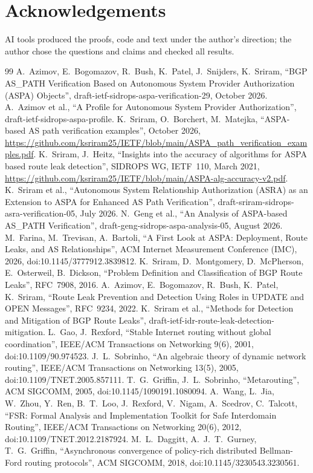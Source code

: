\documentclass[11pt,a4paper]{article}
\theoremstyle{definition}
\theoremstyle{remark}
\begin{document}
\section*{Acknowledgements}
AI tools produced the proofs, code and text under the author's direction; the author chose the questions
and claims and checked all results.

\begin{thebibliography}{99}\small
{} A.~Azimov, E.~Bogomazov, R.~Bush, K.~Patel, J.~Snijders, K.~Sriram,
  ``BGP AS\_PATH Verification Based on Autonomous System Provider Authorization (ASPA) Objects'',
  draft-ietf-sidrops-aspa-verification-29, October 2026.
 A.~Azimov et al., ``A Profile for Autonomous System Provider Authorization'',
  draft-ietf-sidrops-aspa-profile.
 K.~Sriram, O.~Borchert, M.~Matejka, ``ASPA-based AS path verification examples'',
  October 2026, \url{https://github.com/ksriram25/IETF/blob/main/ASPA_path_verification_examples.pdf}.
 K.~Sriram, J.~Heitz, ``Insights into the accuracy of algorithms for ASPA based route
  leak detection'', SIDROPS WG, IETF~110, March 2021,
  \url{https://github.com/ksriram25/IETF/blob/main/ASPA-alg-accuracy-v2.pdf}.
 K.~Sriram et al., ``Autonomous System Relationship Authorization (ASRA) as an Extension to
  ASPA for Enhanced AS Path Verification'', draft-sriram-sidrops-asra-verification-05, July 2026.
 N.~Geng et al., ``An Analysis of ASPA-based AS\_PATH Verification'',
  draft-geng-sidrops-aspa-analysis-05, August 2026.
 M.~Farina, M.~Trevisan, A.~Bartoli, ``A First Look at ASPA: Deployment, Route Leaks, and AS
  Relationships'', ACM Internet Measurement Conference (IMC), 2026, doi:10.1145/3777912.3839812.
 K.~Sriram, D.~Montgomery, D.~McPherson, E.~Osterweil, B.~Dickson, ``Problem Definition and
  Classification of BGP Route Leaks'', RFC~7908, 2016.
 A.~Azimov, E.~Bogomazov, R.~Bush, K.~Patel, K.~Sriram, ``Route Leak Prevention and Detection
  Using Roles in UPDATE and OPEN Messages'', RFC~9234, 2022.
 K.~Sriram et al., ``Methods for Detection and Mitigation of BGP Route Leaks'',
  draft-ietf-idr-route-leak-detection-mitigation.
 L.~Gao, J.~Rexford, ``Stable Internet routing without global coordination'',
  IEEE/ACM Transactions on Networking 9(6), 2001, doi:10.1109/90.974523.
 J.~L.~Sobrinho, ``An algebraic theory of dynamic network routing'', IEEE/ACM
  Transactions on Networking 13(5), 2005, doi:10.1109/TNET.2005.857111.
 T.~G.~Griffin, J.~L.~Sobrinho, ``Metarouting'', ACM SIGCOMM, 2005, doi:10.1145/1090191.1080094.
 A.~Wang, L.~Jia, W.~Zhou, Y.~Ren, B.~T.~Loo, J.~Rexford, V.~Nigam, A.~Scedrov, C.~Talcott,
  ``FSR: Formal Analysis and Implementation Toolkit for Safe Interdomain Routing'', IEEE/ACM Transactions
  on Networking 20(6), 2012, doi:10.1109/TNET.2012.2187924.
 M.~L.~Daggitt, A.~J.~T.~Gurney, T.~G.~Griffin, ``Asynchronous convergence of policy-rich
  distributed Bellman-Ford routing protocols'', ACM SIGCOMM, 2018, doi:10.1145/3230543.3230561.
\end{thebibliography}
\end{document}
